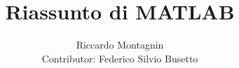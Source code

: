 \documentclass[12pt,a4paper,oneside]{book}
\begin{document}
\title{Riassunto di MATLAB}
\author{Riccardo Montagnin \\ Contributor: Federico Silvio Busetto}
\date{}

\maketitle

\tableofcontents


\newpage

\newpage

\newpage

\newpage

\newpage

\newpage

\newpage

\end{document}
